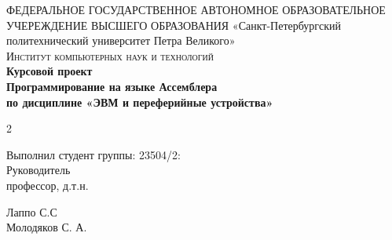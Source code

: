 \documentclass{article}
\begin{document}
\begin{titlepage}


\center %
 

 ФЕДЕРАЛЬНОЕ ГОСУДАРСТВЕННОЕ АВТОНОМНОЕ ОБРАЗОВАТЕЛЬНОЕ УЧЕРЕЖДЕНИЕ ВЫСШЕГО ОБРАЗОВАНИЯ\linebreak  
«Санкт-Петербургский политехнический университет Петра Великого»\\[2cm] %
\textsc{\Large Институт компьютерных наук и технологий}\\[6.5cm] %


{ \huge \bfseries Курсовой проект\\
	\Large \mdseries Программирование на языке Ассемблера\\
	по дисциплине «ЭВМ и переферийные устройства»}\\[6.5cm] %

\begin{multicols}{2}
\begin{flushright} \large

{Выполнил студент группы: 23504/2:}\\[0.5cm]

{Руководитель\\
профессор, д.т.н.}

\end{flushright}
\begin{flushright}
	
	{Лаппо С.С}\\[0.5cm] %
	
	 
	Молодяков С. А. %
	
\end{flushright}
\end{multicols}


\end{titlepage}
\end{document}
